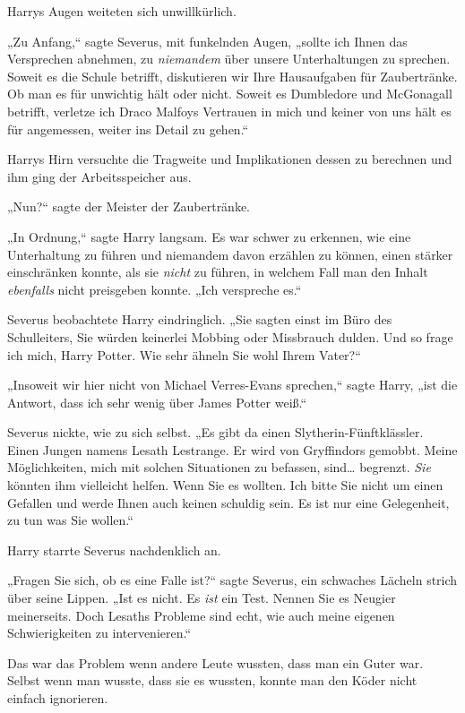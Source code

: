 {Harrys Augen weiteten sich unwillkürlich.

„Zu Anfang,“ sagte Severus, mit funkelnden Augen, „sollte ich Ihnen das Versprechen abnehmen, zu \emph{niemandem} über unsere Unterhaltungen zu sprechen. Soweit es die Schule betrifft, diskutieren wir Ihre Hausaufgaben für Zaubertränke. Ob man es für unwichtig hält oder nicht. Soweit es Dumbledore und McGonagall betrifft, verletze ich Draco Malfoys Vertrauen in mich und keiner von uns hält es für angemessen, weiter ins Detail zu gehen.“

Harrys Hirn versuchte die Tragweite und Implikationen dessen zu berechnen und ihm ging der Arbeitsspeicher aus.

„Nun?“ sagte der Meister der Zaubertränke.

„In Ordnung,“ sagte Harry langsam. Es war schwer zu erkennen, wie eine Unterhaltung zu führen und niemandem davon erzählen zu können, einen stärker einschränken konnte, als sie \emph{nicht} zu führen, in welchem Fall man den Inhalt \emph{ebenfalls} nicht preisgeben konnte. „Ich verspreche es.“

Severus beobachtete Harry eindringlich. „Sie sagten einst im Büro des Schulleiters, Sie würden keinerlei Mobbing oder Missbrauch dulden. Und so frage ich mich, Harry Potter. Wie sehr ähneln Sie wohl Ihrem Vater?“

„Insoweit wir hier nicht von Michael Verres-Evans sprechen,“ sagte Harry, „ist die Antwort, dass ich sehr wenig über James Potter weiß.“

Severus nickte, wie zu sich selbst. „Es gibt da einen Slytherin-Fünftklässler. Einen Jungen namens Lesath Lestrange. Er wird von Gryffindors gemobbt. Meine Möglichkeiten, mich mit solchen Situationen zu befassen, sind… begrenzt. \emph{Sie} könnten ihm vielleicht helfen. Wenn Sie es wollten. Ich bitte Sie nicht um einen Gefallen und werde Ihnen auch keinen schuldig sein. Es ist nur eine Gelegenheit, zu tun was Sie wollen.“

Harry starrte Severus nachdenklich an.

„Fragen Sie sich, ob es eine Falle ist?“ sagte Severus, ein schwaches Lächeln strich über seine Lippen. „Ist es nicht. Es \emph{ist} ein Test. Nennen Sie es Neugier meinerseits. Doch Lesaths Probleme sind echt, wie auch meine eigenen Schwierigkeiten zu intervenieren.“

Das war das Problem wenn andere Leute wussten, dass man ein Guter war. Selbst wenn man wusste, dass sie es wussten, konnte man den Köder nicht einfach ignorieren.

}
